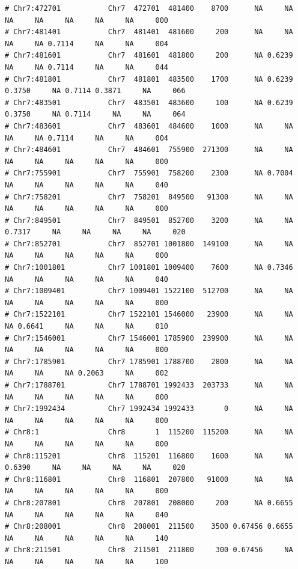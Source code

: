 \documentclass{article}\usepackage[]{graphicx}\usepackage[]{color}
\makeatletter
\newenvironment{kframe}{%
 \def\at@end@of@kframe{}%
 \ifinner\ifhmode%
  \def\at@end@of@kframe{\end{minipage}}%
  \begin{minipage}{\columnwidth}%
 \fi\fi%
 \def\FrameCommand##1{\hskip\@totalleftmargin \hskip-\fboxsep
 \colorbox{shadecolor}{##1}\hskip-\fboxsep
     \hskip-\linewidth \hskip-\@totalleftmargin \hskip\columnwidth}%
 \MakeFramed {\advance\hsize-\width
   \@totalleftmargin\z@ \linewidth\hsize
   \@setminipage}}%
 {\par\unskip\endMakeFramed%
 \at@end@of@kframe}
\newenvironment{knitrout}{}{} %
\makeatother
\begin{document}
\begin{knitrout}
\begin{kframe}
\begin{verbatim}
# Chr7:472701           Chr7  472701  481400    8700      NA     NA     NA     NA     NA     NA     NA     000
# Chr7:481401           Chr7  481401  481600     200      NA     NA     NA     NA 0.7114     NA     NA     004
# Chr7:481601           Chr7  481601  481800     200      NA 0.6239     NA     NA 0.7114     NA     NA     044
# Chr7:481801           Chr7  481801  483500    1700      NA 0.6239 0.3750     NA 0.7114 0.3871     NA     066
# Chr7:483501           Chr7  483501  483600     100      NA 0.6239 0.3750     NA 0.7114     NA     NA     064
# Chr7:483601           Chr7  483601  484600    1000      NA     NA     NA     NA 0.7114     NA     NA     004
# Chr7:484601           Chr7  484601  755900  271300      NA     NA     NA     NA     NA     NA     NA     000
# Chr7:755901           Chr7  755901  758200    2300      NA 0.7004     NA     NA     NA     NA     NA     040
# Chr7:758201           Chr7  758201  849500   91300      NA     NA     NA     NA     NA     NA     NA     000
# Chr7:849501           Chr7  849501  852700    3200      NA     NA 0.7317     NA     NA     NA     NA     020
# Chr7:852701           Chr7  852701 1001800  149100      NA     NA     NA     NA     NA     NA     NA     000
# Chr7:1001801          Chr7 1001801 1009400    7600      NA 0.7346     NA     NA     NA     NA     NA     040
# Chr7:1009401          Chr7 1009401 1522100  512700      NA     NA     NA     NA     NA     NA     NA     000
# Chr7:1522101          Chr7 1522101 1546000   23900      NA     NA     NA 0.6641     NA     NA     NA     010
# Chr7:1546001          Chr7 1546001 1785900  239900      NA     NA     NA     NA     NA     NA     NA     000
# Chr7:1785901          Chr7 1785901 1788700    2800      NA     NA     NA     NA     NA 0.2063     NA     002
# Chr7:1788701          Chr7 1788701 1992433  203733      NA     NA     NA     NA     NA     NA     NA     000
# Chr7:1992434          Chr7 1992434 1992433       0      NA     NA     NA     NA     NA     NA     NA     000
# Chr8:1                Chr8       1  115200  115200      NA     NA     NA     NA     NA     NA     NA     000
# Chr8:115201           Chr8  115201  116800    1600      NA     NA 0.6390     NA     NA     NA     NA     020
# Chr8:116801           Chr8  116801  207800   91000      NA     NA     NA     NA     NA     NA     NA     000
# Chr8:207801           Chr8  207801  208000     200      NA 0.6655     NA     NA     NA     NA     NA     040
# Chr8:208001           Chr8  208001  211500    3500 0.67456 0.6655     NA     NA     NA     NA     NA     140
# Chr8:211501           Chr8  211501  211800     300 0.67456     NA     NA     NA     NA     NA     NA     100

\end{verbatim}
\end{kframe}
\end{knitrout}
\end{document}
